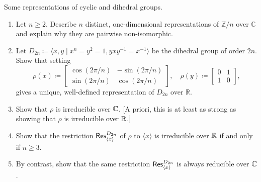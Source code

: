 \begin{problem}
Some representations of cyclic and dihedral groups.
\begin{enumerate}[font=\normalfont,label=\textbf{(\alph*)}]
\item Let $n \geq 2$. Describe $n$ distinct, one-dimensional representations of $\mathbb{Z}/n$ over $\mathbb{C}$ and explain why they are pairwise non-isomorphic.

\item Let $D_{2n} \coloneqq \langle x, y \mid x^n = y^2 = 1, yxy^{-1} = x^{-1} \rangle$ be the dihedral group of order $2n$. Show that setting
\[
\rho(x) \coloneqq
\begin{bmatrix}
\cos(2\pi/n) & -\sin(2\pi/n) \\
\sin(2\pi/n) & \cos(2\pi/n)
\end{bmatrix}
, \quad
\rho(y) \coloneqq
\begin{bmatrix}
0 & 1 \\
1 & 0
\end{bmatrix}
,
\]
gives a unique, well-defined representation of $D_{2n}$ over $\mathbb{R}$.

\item Show that $\rho$ is irreducible over $\mathbb{C}$. [A priori, this is at least as strong as showing that $\rho$ is irreducible over $\mathbb{R}$.]

\item Show that the restriction $\mathsf{Res}^{D_{2n}}_{\langle x\rangle}$ of $\rho$ to $\langle x \rangle$ is irreducible over $\mathbb{R}$ if and only if $n\geq 3$.

\item By contrast, show that the same restriction $\mathsf{Res}^{D_{2n}}_{\langle x\rangle}$ is always reducible over $\mathbb{C}$.
\end{enumerate}
\end{problem}

